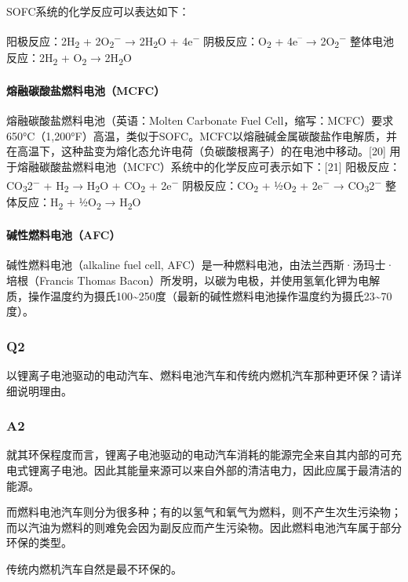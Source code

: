 \documentclass[
]{article}
\begin{document}
SOFC系统的化学反应可以表达如下：

阳极反应：2H\textsubscript{2} + 2O\textsubscript{2}\textsuperscript{−} →
2H\textsubscript{2}O + 4e\textsuperscript{−}
阴极反应：O\textsubscript{2} + 4e\textsuperscript{--} →
2O\textsubscript{2}\textsuperscript{−} 整体电池反应：2H\textsubscript{2}
+ O\textsubscript{2} → 2H\textsubscript{2}O

\hypertarget{header-n41}{%
\paragraph{熔融碳酸盐燃料电池（MCFC）}\label{header-n41}}

熔融碳酸盐燃料电池（英语：Molten Carbonate Fuel
Cell，缩写：MCFC）要求650°C（1,200°F）高温，类似于SOFC。MCFC以熔融碱金属碳酸盐作电解质，并在高温下，这种盐变为熔化态允许电荷（负碳酸根离子）的在电池中移动。{[}20{]}
用于熔融碳酸盐燃料电池（MCFC）系统中的化学反应可表示如下：{[}21{]}
阳极反应：CO\textsubscript{3}2\textsuperscript{−} + H\textsubscript{2} →
H\textsubscript{2}O + CO\textsubscript{2} + 2e\textsuperscript{−}
阴极反应：CO\textsubscript{2} + ½O\textsubscript{2} +
2e\textsuperscript{−} → CO\textsubscript{3}2\textsuperscript{−}
整体反应：H\textsubscript{2} + ½O\textsubscript{2} → H\textsubscript{2}O

\hypertarget{header-n48}{%
\paragraph{碱性燃料电池（AFC）}\label{header-n48}}

碱性燃料电池（alkaline fuel cell,
AFC）是一种燃料电池，由法兰西斯·汤玛士·培根（Francis Thomas
Bacon）所发明，以碳为电极，并使用氢氧化钾为电解质，操作温度约为摄氏100\textasciitilde{}250度（最新的碱性燃料电池操作温度约为摄氏23\textasciitilde{}70度）。

\hypertarget{header-n9}{%
\subsubsection{Q2}\label{header-n9}}

以锂离子电池驱动的电动汽车、燃料电池汽车和传统内燃机汽车那种更环保？请详细说明理由。

\hypertarget{header-n57}{%
\subsubsection{A2}\label{header-n57}}

就其环保程度而言，锂离子电池驱动的电动汽车消耗的能源完全来自其内部的可充电式锂离子电池。因此其能量来源可以来自外部的清洁电力，因此应属于最清洁的能源。

而燃料电池汽车则分为很多种；有的以氢气和氧气为燃料，则不产生次生污染物；而以汽油为燃料的则难免会因为副反应而产生污染物。因此燃料电池汽车属于部分环保的类型。

传统内燃机汽车自然是最不环保的。
\end{document}
